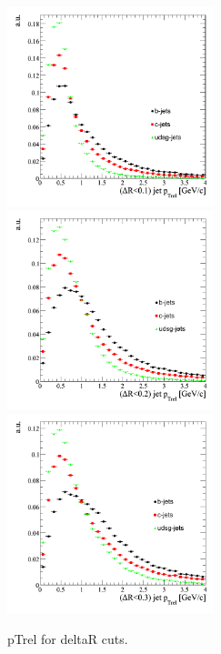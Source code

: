 \begin{figure}[htbp]
  \begin{center}
    \includegraphics[width=60mm]{Figures/jet_ptrel_deltaR1.png}
    \includegraphics[width=60mm]{Figures/jet_ptrel_deltaR2.png}
    \includegraphics[width=60mm]{Figures/jet_ptrel_deltaR3.png}
  \end{center}
  \caption{pTrel for deltaR cuts.}
  \label{fig:jet_ptrel}
\end{figure}

